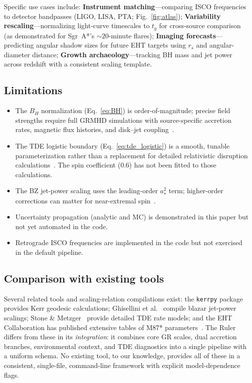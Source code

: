 \documentclass[11pt]{article}
\begin{document}
Specific use cases include:
\textbf{Instrument matching}---comparing ISCO frequencies to detector bandpasses (LIGO, LISA, PTA; Fig.~\ref{fig:atlas});
\textbf{Variability rescaling}---normalizing light-curve timescales to $t_g$ for cross-source comparison (as demonstrated for Sgr~A*'s $\sim 20$-minute flares);
\textbf{Imaging forecasts}---predicting angular shadow sizes for future EHT targets using $r_s$ and angular-diameter distance;
\textbf{Growth archaeology}---tracking BH mass and jet power across redshift with a consistent scaling template.

\subsection{Limitations}

\begin{itemize}
\item The $B_H$ normalization (Eq.~\ref{eq:BH}) is order-of-magnitude; precise field strengths require full GRMHD simulations with source-specific accretion rates, magnetic flux histories, and disk--jet coupling~\cite{Tchekhovskoy2011,McKinney2012}.
\item The TDE logistic boundary (Eq.~\ref{eq:tde_logistic}) is a smooth, tunable parameterization rather than a replacement for detailed relativistic disruption calculations~\cite{Kesden2012,ServinKesden2017}. The spin coefficient (0.6) has not been fitted to those calculations.
\item The BZ jet-power scaling uses the leading-order $a_*^2$ term; higher-order corrections can matter for near-extremal spin~\cite{Tchekhovskoy2010}.
\item Uncertainty propagation (analytic and MC) is demonstrated in this paper but not yet automated in the code.
\item Retrograde ISCO frequencies are implemented in the code but not exercised in the default pipeline.
\end{itemize}

\subsection{Comparison with existing tools}

Several related tools and scaling-relation compilations exist:
the \texttt{kerrpy} package provides Kerr geodesic calculations;
Ghisellini et al.~\cite{GhiselliniFoschiniGhirlanda2005} compile blazar jet-power scalings;
Stone \& Metzger~\cite{Stone2016} provide detailed TDE rate models;
and the EHT Collaboration has published extensive tables of M87* parameters~\cite{EHT2019M87I,EHT2021M87Pol}.
The Ruler differs from these in its \emph{integration}: it combines core GR scales, dual accretion branches, environmental context, and TDE diagnostics into a single pipeline with a uniform schema.
No existing tool, to our knowledge, provides all of these in a consistent, single-file, command-line framework with explicit model-dependence flags.
\end{document}
